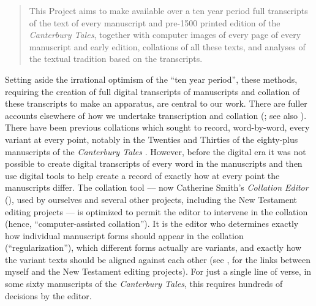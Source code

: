 \begin{review}
\begin{quote}
This Project aims to make available over a ten year period full
transcripts of the text of every manuscript and pre-1500 printed edition
of the \emph{Canterbury Tales}, together with computer images of every
page of every manuscript and early edition, collations of all these
texts, and analyses of the textual tradition based on the transcripts.

\begin{flushright}
    \parencite{robinson_canterbury_1993}
\end{flushright}

\end{quote}

\noindent Setting aside the irrational optimism of the ``ten year period'', these
methods, requiring the creation of full digital transcripts of
manuscripts and collation of these transcripts to make an apparatus, are
central to our work. There are fuller accounts elsewhere of how we
undertake transcription and collation (\cite{bitner_macron_2021}; see also \cite{bordalejo_youre_2021}). There have been previous collations which
sought to record, word-by-word, every variant at every point, notably in
the Twenties and Thirties of the eighty-plus manuscripts of the
\emph{Canterbury Tales} \parencite{manly_text_1940}. However, before the
digital era it was not possible to create digital transcripts of every
word in the manuscripts and then use digital tools to help create a
record of exactly how at every point the manuscripts differ. The
collation tool –– now Catherine Smith's \emph{Collation Editor}
(\citeyear{smith_collation_2018}), used by ourselves and several other projects, including the
New Testament editing projects –– is optimized to permit the editor to
intervene in the collation (hence, ``computer-assisted collation''). It
is the editor who determines exactly how individual manuscript forms
should appear in the collation (``regularization''), which different
forms actually are variants, and exactly how the variant texts should be
aligned against each other (see \cite{houghton_editio_2020}, for the links
between myself and the New Testament editing projects). For just a
single line of verse, in some sixty manuscripts of the \emph{Canterbury
Tales}, this requires hundreds of decisions by the editor.


\end{review}
